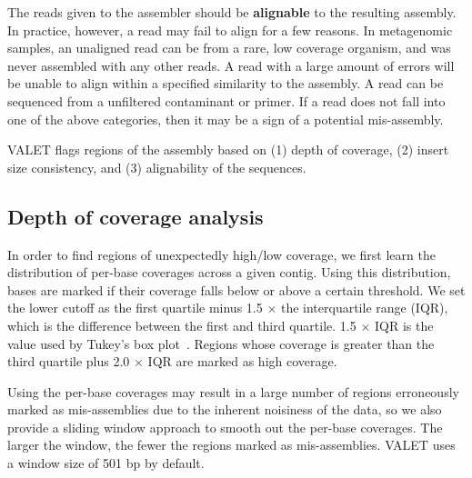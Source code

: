 \documentclass{bioinfo}
\begin{document}
The reads given to the assembler should be \textbf{alignable} to the resulting assembly.
In practice, however, a read may fail to align for a few reasons.
In metagenomic samples, an unaligned read can be from a rare, low coverage organism, and was never assembled with any other reads.
A read with a large amount of errors will be unable to align within a specified similarity to the assembly.
A read can be sequenced from a unfiltered contaminant or primer.
If a read does not fall into one of the above categories, then it may be a sign of a potential mis-assembly.


VALET flags regions of the assembly based on (1) depth of coverage, (2) insert size consistency, and (3) alignability of the sequences.

\subsection{Depth of coverage analysis}

In order to find regions of unexpectedly high/low coverage, we first learn the distribution of per-base coverages across a given contig.  Using this distribution, bases are marked if their coverage falls below or above a certain threshold.  We set the lower cutoff as the first quartile minus 1.5 $\times$ the interquartile range (IQR), which is the difference between the first and third quartile. 1.5 $\times$ IQR is the value used by Tukey’s box plot~\citep{mcgill1978variations}.  Regions whose coverage is greater than the third quartile plus 2.0 $\times$ IQR are marked as high coverage.

Using the per-base coverages may result in a large number of regions erroneously marked as mis-assemblies due to the inherent noisiness of the data, so we also provide a sliding window approach to smooth out the per-base coverages. The larger the window, the fewer the regions marked as mis-assemblies.
VALET uses a window size of 501 bp by default.
\end{document}
